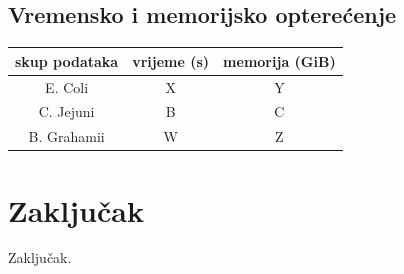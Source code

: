 \documentclass[times, utf8, seminar, numeric]{fer}
\begin{document}
\section{Vremensko i memorijsko opterećenje}

\begin{center}
\begin{tabular}[h]{|c||c|c|}
	\hline
	skup podataka & vrijeme (s) & memorija (GiB)\\
	\hline
	\hline
	E. Coli & X & Y \\
	\hline
	C. Jejuni & B & C \\
	\hline
	B. Grahamii & W & Z \\
	\hline
\end{tabular}
\end{center}

\chapter{Zaključak}
Zaključak.



\end{document}
